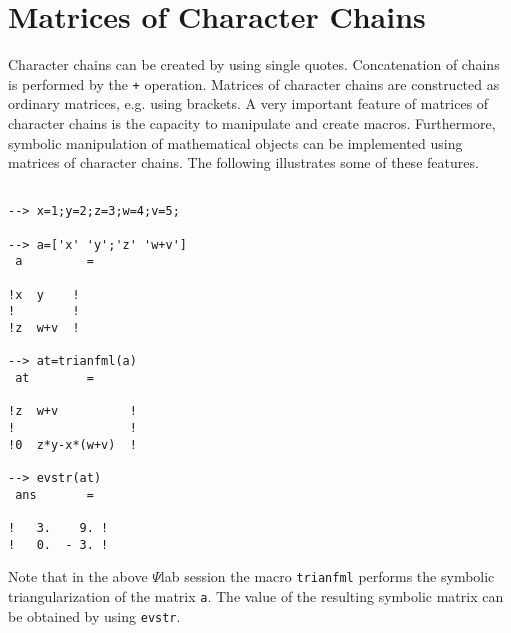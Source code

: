 \section{Matrices of Character Chains}
\label{s2.3}

	Character chains can be created by using single quotes.
Concatenation of chains is performed by the {\tt +} operation.
Matrices of character chains are constructed as ordinary matrices,
e.g. using brackets.
A very important feature of matrices of character chains is
the capacity to manipulate and create macros.  Furthermore,
symbolic manipulation of mathematical objects can be implemented
using matrices of character chains.  The following illustrates
some of these features. 
\begin{verbatim}
 
--> x=1;y=2;z=3;w=4;v=5;
 
--> a=['x' 'y';'z' 'w+v']
 a         =
 
!x  y    !
!        !
!z  w+v  !
 
--> at=trianfml(a)
 at        =
 
!z  w+v          !
!                !
!0  z*y-x*(w+v)  !
 
--> evstr(at)
 ans       =
 
!   3.    9. !
!   0.  - 3. !
\end{verbatim}
Note that in the above $\Psi$lab session the macro 
{\tt trianfml}
performs the symbolic triangularization of the matrix {\tt a}.
The value of the resulting symbolic matrix can be obtained by
using {\tt evstr}.  

